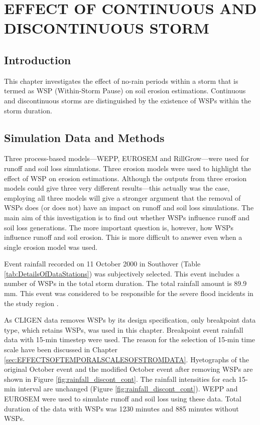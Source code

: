 \chapter{EFFECT OF CONTINUOUS AND DISCONTINUOUS STORM}
\label{sec:EFFECTSOFCONTINOUSANDDISCONTINUSSTORM}

\section{Introduction}
\label{sec:ContinousAndDiscontinousStormIntroduction}
This chapter investigates the effect of no-rain periods within a storm
that is termed as WSP (Within-Storm Pause) on soil erosion estimations.
Continuous and discontinuous storms are distinguished by the existence of WSPs
within the storm duration.


\section{Simulation Data and Methods}
\label{sec:ContinousAndDiscontinousStormMethods}

Three process-based models---WEPP, EUROSEM and RillGrow---were used for
runoff and soil loss simulations. Three erosion models were used to highlight
the effect of WSP on erosion estimations. Although the outputs from three
erosion models could give three very different results---this actually was the
case, employing all three models will give a stronger argument that the removal
of WSPs does (or does not) have an impact on runoff and soil loss simulations.
The main aim of this investigation is to find out whether WSPs influence runoff
and soil loss generations. The more important question is, however, how WSPs
influence runoff and soil erosion. This is more difficult to answer even when a
single erosion model was used.

Event rainfall recorded on 11 October 2000 in Southover (Table
\ref{tab:DetailsOfDataStations}) was subjectively selected. This event includes
a number of WSPs in the total storm duration. The total rainfall amount is 89.9
mm. This event was considered to be responsible for the severe flood incidents
in the study region \citep{boardman2001-346}.

As CLIGEN data removes WSPs by its design specification, only breakpoint data
type, which retains WSPs, was used in this chapter. Breakpoint event rainfall
data with 15-min timestep were used. The reason for the selection of 15-min time
scale have been discussed in Chapter
\ref{sec:EFFECTSOFTEMPORALSCALESOFSTROMDATA}. Hyetographs of the original
October event and the modified October event after removing WSPs are shown in
Figure \ref{fig:rainfall_discont_cont}. The rainfall intensities for each 15-min
interval are unchanged (Figure \ref{fig:rainfall_discont_cont}). WEPP and
EUROSEM were used to simulate runoff and soil loss using these data. Total
duration of the data with WSPs was 1230 minutes and 885 minutes without WSPs.

